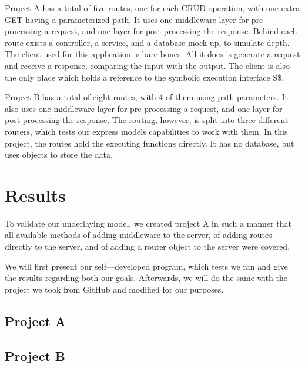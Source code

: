 Project A has a total of five routes, one for each CRUD operation, with one extra GET having a parameterized path.
It uses one middleware layer for pre-processing a request, and one layer for post-processing the response. Behind each route exists a controller, a service, and a database mock-up, to simulate depth. 
The client used for this application is bare-bones. All it does is generate a request and receive a response, comparing the input with the output. The client is also the only place which holds a reference to the symbolic execution interface S\$.

Project B has a total of eight routes, with 4 of them using path parameters.
It also uses one middleware layer for pre-processing a request, and one layer for post-processing the response. The routing, however, is split into three different routers, which tests our express models capabilities to work with them. In this project, the routes hold the executing functions directly. It has no database, but uses objects to store the data.



\section{Results}
\label{sec:results}

To validate our underlaying model, we created project A in such a manner that all available methods of adding middleware to the server, of adding routes directly to the server, and of adding a router object to the server were covered. 





We will first present our self—developed program, which tests we ran and give the results regarding both our goals. Afterwards, we will do the same with the project we took from GitHub and modified for our purposes.



\subsection{Project A}





\subsection{Project B}

